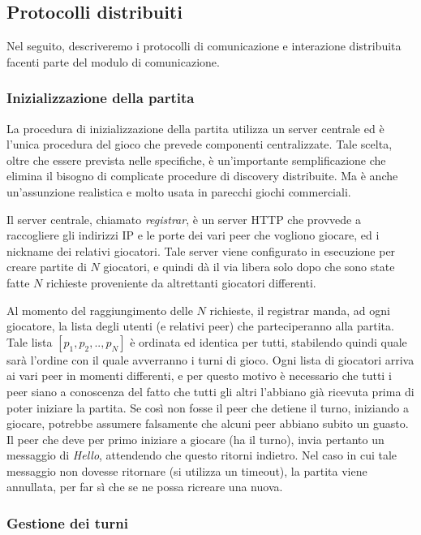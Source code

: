 \documentclass[9pt]{article}
\begin{document}
\subsection{Protocolli distribuiti}
Nel seguito, descriveremo i protocolli di comunicazione e interazione distribuita facenti parte del modulo di comunicazione.

\subsubsection*{Inizializzazione della partita}

La procedura di inizializzazione della partita utilizza un server centrale ed è l'unica procedura del gioco che prevede componenti centralizzate. Tale scelta, oltre che essere prevista nelle specifiche, è un'importante semplificazione che elimina il bisogno di complicate procedure di discovery distribuite. Ma è anche un'assunzione realistica e molto usata in parecchi giochi commerciali.

Il server centrale, chiamato \textit{registrar}, è un server HTTP che provvede a raccogliere gli indirizzi IP e le porte dei vari peer che vogliono giocare, ed i nickname dei relativi giocatori. Tale server viene configurato in esecuzione per creare partite di $N$ giocatori, e quindi dà il via libera solo dopo che sono state fatte $N$ richieste proveniente da altrettanti giocatori differenti.

Al momento del raggiungimento delle $N$ richieste, il registrar manda, ad ogni giocatore, la lista degli utenti (e relativi peer) che parteciperanno alla partita. Tale lista $[p_1, p_2, .., p_N]$ è ordinata ed identica per tutti, stabilendo quindi quale sarà l'ordine con il quale avverranno i turni di gioco. Ogni lista di giocatori arriva ai vari peer in momenti differenti, e per questo motivo è necessario che tutti i peer siano a conoscenza del fatto che tutti gli altri l'abbiano già ricevuta prima di poter iniziare la partita. Se così non fosse il peer che detiene il turno, iniziando a giocare, potrebbe assumere falsamente che alcuni peer abbiano subito un guasto. Il peer che deve per primo iniziare a giocare (ha il turno), invia pertanto un messaggio di \textit{Hello}, attendendo che questo ritorni indietro. Nel caso in cui tale messaggio non dovesse ritornare (si utilizza un timeout), la partita viene annullata, per far sì che se ne possa ricreare una nuova. 



\subsubsection*{Gestione dei turni}
\end{document}
